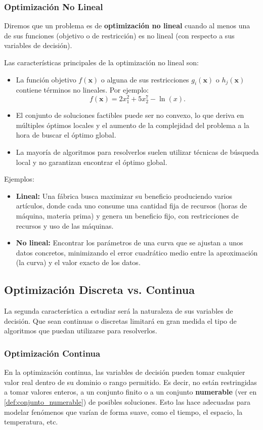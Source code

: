 \documentclass[12pt,a4paper]{book}
\begin{document}
\subsubsection{Optimización No Lineal}
Diremos que un problema es de \textbf{optimización no lineal} cuando al menos una de sus funciones (objetivo o de restricción) es no lineal (con respecto a sus variables de decisión). 

Las características principales de la optimización no lineal son:
\begin{itemize}
    \item La función objetivo $f(\mathbf{x})$ o alguna de sus restricciones $g_i(\mathbf{x})$ o $h_j(\mathbf{x})$ contiene términos no lineales. Por ejemplo:
    $$f(\mathbf{x})=2x_1^2+5x_2^7-\ln(x).$$
    \item El conjunto de soluciones factibles puede ser no convexo, lo que deriva en múltiples óptimos locales y el aumento de la complejidad del problema a la hora de buscar el óptimo global.
    \item La mayoría de algoritmos para resolverlos suelen utilizar técnicas de búsqueda local y no garantizan encontrar el óptimo global.
\end{itemize}

Ejemplos:
\begin{itemize}
    \item \textbf{Lineal:} Una fábrica busca maximizar su beneficio produciendo varios artículos, donde cada uno consume una cantidad fija de recursos (horas de máquina, materia prima) y genera un beneficio fijo, con restricciones de recursos y uso de las máquinas.
    \item \textbf{No lineal:} Encontrar los parámetros de una curva que se ajustan a unos datos concretos, minimizando el error cuadrático medio entre la aproximación (la curva) y el valor exacto de los datos.
\end{itemize}


\subsection{Optimización Discreta vs. Continua}
La segunda característica a estudiar será la naturaleza de sus variables de decisión. Que sean continuas o discretas
limitará en gran medida el tipo de algoritmos que puedan utilizarse para resolverlos.

\subsubsection{Optimización Continua}
En la optimización continua, las variables de decisión pueden tomar cualquier valor real dentro de su dominio o rango permitido. Es decir, no están restringidas a tomar valores enteros, a un conjunto finito o a un conjunto \textbf{numerable} (ver en \ref{def:conjunto_numerable}) de posibles soluciones. Esto las hace adecuadas para modelar fenómenos que varían de forma suave, como el tiempo, el espacio, la temperatura, etc.
\end{document}
